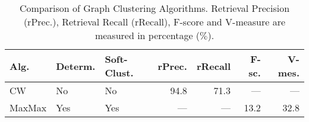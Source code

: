 \begin{table}
\centering
\caption{\label{tab:clalg} Comparison of Graph Clustering Algorithms. Retrieval
Precision (rPrec.), Retrieval Recall (rRecall), F-score and V-measure are
measured in percentage ($\%$).}

\begin{tabu} to \textwidth {XXXrrrr}
\hline
\textbf{Alg.} & \textbf{Determ.} & \textbf{Soft-Clust.} & \textbf{rPrec.} & \textbf{rRecall} & \textbf{F-sc.} & \textbf{V-mes.} \\
\hline
\ac{CW} \cite{biemann2006chinese} & No            & No              & 94.8 & 71.3 & ---  & ---  \\
MaxMax \cite{hope2013maxmax}      & Yes           & Yes             & ---  & ---  & 13.2 & 32.8 \\
\hline
\end{tabu}
\end{table}
